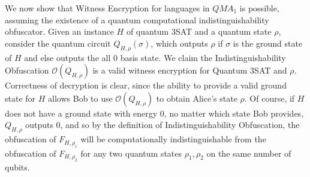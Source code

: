 \documentclass[11pt]{article}
\numberwithin{equation}{section}
\newcommand{\algo}{\mathcal}
\begin{document}
{We now show that Witness Encryption for languages in $QMA_1$ is possible, assuming the existence of a quantum computational indistinguishability obfuscator.  Given an instance $H$ of quantum $3$SAT and a quantum state $\rho$, consider the quantum circuit $Q_{H,\rho}(\sigma)$, which outputs $\rho$ if $\sigma$ is the ground state of $H$ and else outputs the all $0$ basis state.  We claim the Indistinguishability Obfuscation $\algo{O}(Q_{H,\rho})$ is a valid witness encryption for Quantum $3$SAT and $\rho$.  Correctness of decryption is clear, since the ability to provide a valid ground state for $H$ allows Bob to use $\algo{O}(Q_{H,\rho})$ to obtain Alice's state $\rho$.  Of course, if $H$ does not have a ground state with energy $0$, no matter which state Bob provides, $Q_{H,\rho}$ outputs 0, and so by the definition of Indistinguishability Obfuscation, the obfuscation of $F_{H,\rho_1}$ will be computationally indistinguishable from the obfuscation of $F_{H,\rho_2}$ for any two quantum states $\rho_1,\rho_2$ on the same number of qubits.

%

}
\end{document}
